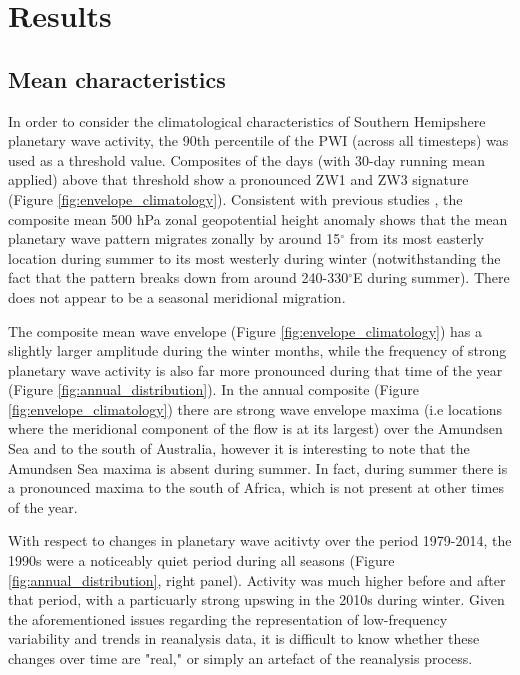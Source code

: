 \section{Results}

\subsection{Mean characteristics}

In order to consider the climatological characteristics of Southern Hemipshere planetary wave activity, the 90th percentile of the PWI (across all timesteps) was used as a threshold value. Composites of the days (with 30-day running mean applied) above that threshold show a pronounced ZW1 and ZW3 signature (Figure \ref{fig:envelope_climatology}). Consistent with previous studies \citep{vanLoon1984,Mo1985}, the composite mean 500 hPa zonal geopotential height anomaly shows that the mean planetary wave pattern migrates zonally by around 15$^{\circ}$ from its most easterly location during summer to its most westerly during winter (notwithstanding the fact that the pattern breaks down from around 240-330$^{\circ}$E during summer). There does not appear to be a seasonal meridional migration.

The composite mean wave envelope (Figure \ref{fig:envelope_climatology}) has a slightly larger amplitude during the winter months, while the frequency of strong planetary wave activity is also far more pronounced during that time of the year (Figure \ref{fig:annual_distribution}). In the annual composite (Figure \ref{fig:envelope_climatology}) there are strong wave envelope maxima (i.e locations where the meridional component of the flow is at its largest) over the Amundsen Sea and to the south of Australia, however it is interesting to note that the Amundsen Sea maxima is absent during summer. In fact, during summer there is a pronounced maxima to the south of Africa, which is not present at other times of the year.

With respect to changes in planetary wave acitivty over the period 1979-2014, the 1990s were a noticeably quiet period during all seasons (Figure \ref{fig:annual_distribution}, right panel). Activity was much higher before and after that period, with a particuarly strong upswing in the 2010s during winter. Given the aforementioned issues regarding the representation of low-frequency variability and trends in reanalysis data, it is difficult to know whether these changes over time are "real," or simply an artefact of the reanalysis process.
